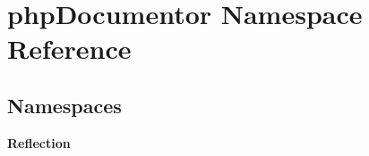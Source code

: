 \section{php\+Documentor Namespace Reference}
\label{namespacephp_documentor}
\subsection*{Namespaces}
\begin{DoxyCompactItemize}
\item 
 {\bf Reflection}
\end{DoxyCompactItemize}
